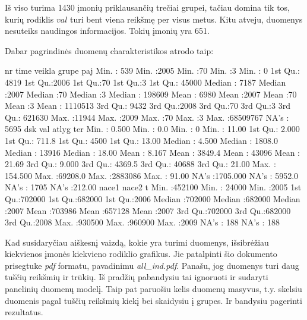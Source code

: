\documentclass[a4paper]{article}
\begin{document}
Iš viso turima 1430 įmonių priklausančių trečiai grupei, tačiau domina
tik tos, kurių rodiklis $val$ turi bent viena reikšmę per visus metus.
Kitu atveju, duomenys nesuteiks naudingos informacijos. Tokių įmonių
yra 651.

Dabar pagrindinės duomenų charakteristikos atrodo taip:
\begin{Schunk}
\begin{Soutput}
       nr             time          veikla       grupe        paj          
 Min.   :  539   Min.   :2005   Min.   :70   Min.   :3   Min.   :       0  
 1st Qu.: 4819   1st Qu.:2006   1st Qu.:70   1st Qu.:3   1st Qu.:   45000  
 Median : 7187   Median :2007   Median :70   Median :3   Median :  198609  
 Mean   : 6980   Mean   :2007   Mean   :70   Mean   :3   Mean   : 1110513  
 3rd Qu.: 9432   3rd Qu.:2008   3rd Qu.:70   3rd Qu.:3   3rd Qu.:  621630  
 Max.   :11944   Max.   :2009   Max.   :70   Max.   :3   Max.   :68509767  
                                                         NA's   :    5695  
      dsk                val              atlyg              ter        
 Min.   :   0.500   Min.   :    0.0   Min.   :      0   Min.   : 11.00  
 1st Qu.:   2.000   1st Qu.:  711.8   1st Qu.:   4500   1st Qu.: 13.00  
 Median :   4.500   Median : 1808.0   Median :  13916   Median : 18.00  
 Mean   :   8.167   Mean   : 3849.4   Mean   :  43096   Mean   : 21.69  
 3rd Qu.:   9.000   3rd Qu.: 4369.5   3rd Qu.:  40688   3rd Qu.: 21.00  
 Max.   : 154.500   Max.   :69208.0   Max.   :2883086   Max.   : 91.00  
 NA's   :1705.000   NA's   : 5952.0   NA's   :   1705   NA's   :212.00  
     nace1            nace2              t       
 Min.   :452100   Min.   : 24000   Min.   :2005  
 1st Qu.:702000   1st Qu.:682000   1st Qu.:2006  
 Median :702000   Median :682000   Median :2007  
 Mean   :703986   Mean   :657128   Mean   :2007  
 3rd Qu.:702000   3rd Qu.:682000   3rd Qu.:2008  
 Max.   :930500   Max.   :960900   Max.   :2009  
 NA's   :   188   NA's   :   188                 
\end{Soutput}
\end{Schunk}

Kad susidaryčiau aiškesnį vaizdą, kokie yra turimi duomenys,
išsibrėžiau kiekvienos įmonės kiekvieno rodiklio grafikus. Jie
patalpinti šio dokumento prisegtuke \emph{pdf} formatu, pavadinimu
\emph{all\_ind.pdf}. Panašu, jog duomenys turi daug tuščių reikšmių ir
trūkių. Iš pradžių pabandysiu tai ignoruoti ir sudaryti panelinių
duomenų modelį. Taip pat paruošiu kelis duomenų masyvus, t.y. skelsiu
duomenis pagal tuščių reikšmių kiekį bei skaidysiu į grupes. Ir
bandysiu pagerinti rezultatus.
\end{document}
